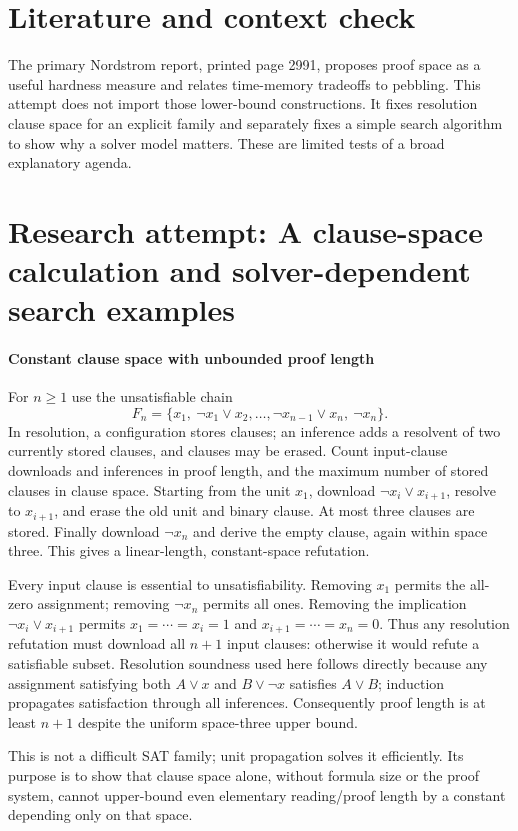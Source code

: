 \documentclass[11pt]{article}
\begin{document}
\section{Literature and context check}
The primary Nordstrom report, printed page 2991, proposes proof space as a useful hardness measure and relates time-memory tradeoffs to pebbling. This attempt does not import those lower-bound constructions. It fixes resolution clause space for an explicit family and separately fixes a simple search algorithm to show why a solver model matters. These are limited tests of a broad explanatory agenda.
\section{Research attempt: A clause-space calculation and solver-dependent search examples}

\paragraph{Constant clause space with unbounded proof length}
For $n\geq1$ use the unsatisfiable chain
\[
 F_n=\{x_1,\ \neg x_1\vee x_2,\ldots,\neg x_{n-1}\vee x_n,\ \neg x_n\}.
\]
In resolution, a configuration stores clauses; an inference adds a resolvent of two currently stored clauses, and clauses may be erased. Count input-clause downloads and inferences in proof length, and the maximum number of stored clauses in clause space. Starting from the unit $x_1$, download $\neg x_i\vee x_{i+1}$, resolve to $x_{i+1}$, and erase the old unit and binary clause. At most three clauses are stored. Finally download $\neg x_n$ and derive the empty clause, again within space three. This gives a linear-length, constant-space refutation.

Every input clause is essential to unsatisfiability. Removing $x_1$ permits the all-zero assignment; removing $\neg x_n$ permits all ones. Removing the implication $\neg x_i\vee x_{i+1}$ permits $x_1=\cdots=x_i=1$ and $x_{i+1}=\cdots=x_n=0$. Thus any resolution refutation must download all $n+1$ input clauses: otherwise it would refute a satisfiable subset. Resolution soundness used here follows directly because any assignment satisfying both $A\vee x$ and $B\vee\neg x$ satisfies $A\vee B$; induction propagates satisfaction through all inferences. Consequently proof length is at least $n+1$ despite the uniform space-three upper bound.

This is not a difficult SAT family; unit propagation solves it efficiently. Its purpose is to show that clause space alone, without formula size or the proof system, cannot upper-bound even elementary reading/proof length by a constant depending only on that space.
\end{document}
